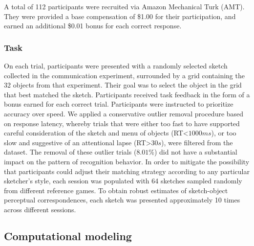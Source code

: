 \documentclass[9pt,twocolumn,twoside]{pnas-new}
\begin{document}
{A total of 112 participants were recruited via Amazon Mechanical Turk (AMT). They were provided a base compensation of \$1.00 for their participation, and earned an additional \$0.01 bonus for each correct response.

\subsubsection*{Task}
On each trial, participants were presented with a randomly selected sketch collected in the communication experiment, surrounded by a grid containing the 32 objects from that experiment. 
Their goal was to select the object in the grid that best matched the sketch. 
Participants received task feedback in the form of a bonus earned for each correct trial. 
Participants were instructed to prioritize accuracy over speed. 
We applied a conservative outlier removal procedure based on response latency, whereby trials that were either too fast to have supported careful consideration of the sketch and menu of objects (RT<$1000ms$), or too slow and suggestive of an attentional lapse (RT>$30s$), were filtered from the dataset. 
The removal of these outlier trials ($8.01$\%) did not have a substantial impact on the pattern of recognition behavior. 
In order to mitigate the possibility that participants could adjust their matching strategy according to any particular sketcher's style, each session was populated with 64 sketches sampled randomly from different reference games. 
To obtain robust estimates of sketch-object perceptual correspondences, each sketch was presented approximately 10 times across different sessions.  


\subsection*{Computational modeling}


}
\end{document}
